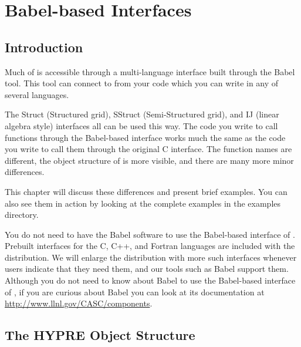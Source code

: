 
\chapter{Babel-based Interfaces}
\label{ch-babel}

\section{Introduction}

Much of \hypre{} is accessible through a multi-language interface
built through the Babel tool.  This tool can connect to \hypre{} from
your code which you can write in any of several languages.

The Struct (Structured grid), SStruct (Semi-Structured grid), and IJ
(linear algebra style) interfaces all can be used
this way.  The code you write to call \hypre{} functions through the
Babel-based interface works much the same as the code you write to
call them through the original C interface.  The function names are
different, the object structure of \hypre{} is more visible, and there
are many more minor differences.

This chapter will discuss these differences and present brief
examples.  You can also see them in action by looking at the complete
examples in the examples directory.

You do not need to have the Babel software to use the Babel-based
interface of \hypre{}.  Prebuilt interfaces for the C, C++, and
Fortran languages are included with the \hypre{} distribution.  We
will enlarge the distribution with more such interfaces whenever \hypre{}
users indicate that they need them, and our tools such as Babel
support them.  Although you do not need to know about Babel to use the
Babel-based interface of \hypre{}, if you are curious about Babel you
can look at its documentation at \url{http://www.llnl.gov/CASC/components}.


\section{The HYPRE Object Structure}

